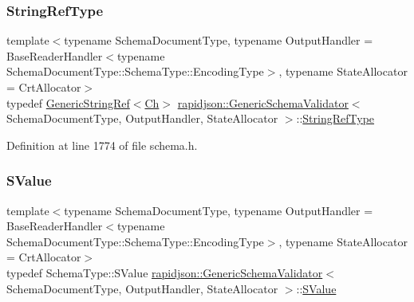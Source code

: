 \subsubsection{\texorpdfstring{StringRefType}{StringRefType}}
{\footnotesize\ttfamily template$<$typename Schema\+Document\+Type, typename Output\+Handler = Base\+Reader\+Handler$<$typename Schema\+Document\+Type\+::\+Schema\+Type\+::\+Encoding\+Type$>$, typename State\+Allocator = Crt\+Allocator$>$ \\
typedef \mbox{\hyperlink{structrapidjson_1_1_generic_string_ref}{Generic\+String\+Ref}}$<$\mbox{\hyperlink{classrapidjson_1_1_generic_schema_validator_ab5b7093443e29cf66eb7cf47f3d8583d}{Ch}}$>$ \mbox{\hyperlink{classrapidjson_1_1_generic_schema_validator}{rapidjson\+::\+Generic\+Schema\+Validator}}$<$ Schema\+Document\+Type, Output\+Handler, State\+Allocator $>$\+::\mbox{\hyperlink{classrapidjson_1_1_generic_schema_validator_af6d33bab73e771af8c06f2b05e878350}{String\+Ref\+Type}}}



Definition at line 1774 of file schema.\+h.

\mbox{\label{classrapidjson_1_1_generic_schema_validator_a545e4e19bd9419d908bc21e1a7a6170d}} 
\subsubsection{\texorpdfstring{SValue}{SValue}}
{\footnotesize\ttfamily template$<$typename Schema\+Document\+Type, typename Output\+Handler = Base\+Reader\+Handler$<$typename Schema\+Document\+Type\+::\+Schema\+Type\+::\+Encoding\+Type$>$, typename State\+Allocator = Crt\+Allocator$>$ \\
typedef Schema\+Type\+::\+S\+Value \mbox{\hyperlink{classrapidjson_1_1_generic_schema_validator}{rapidjson\+::\+Generic\+Schema\+Validator}}$<$ Schema\+Document\+Type, Output\+Handler, State\+Allocator $>$\+::\mbox{\hyperlink{classrapidjson_1_1_generic_schema_validator_a545e4e19bd9419d908bc21e1a7a6170d}{S\+Value}}}



